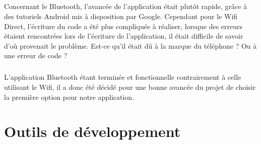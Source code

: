 \documentclass[a4paper,10pt]{report}
\begin{document}
  \paragraph{}
  Concernant le Bluetooth, l'avancée de l'application était plutôt rapide, grâce à des tutoriels Android mis à disposition par Google. Cependant pour le Wifi Direct, l'écriture du code a été plus compliquée à réaliser, lorsque des erreurs étaient rencontrées lors de l'écriture de l'application, il était difficile de savoir d'où provenait le problème. Est-ce qu'il était dû à la marque du téléphone ? Ou à une erreur de code ? 
  \paragraph{} 
  L'application Bluetooth étant terminée et fonctionnelle contrairement à celle utilisant le Wifi, il a donc été décidé pour une bonne avancée du projet de choisir la première option pour notre application.
  

\chapter{Outils de développement}
\end{document}
